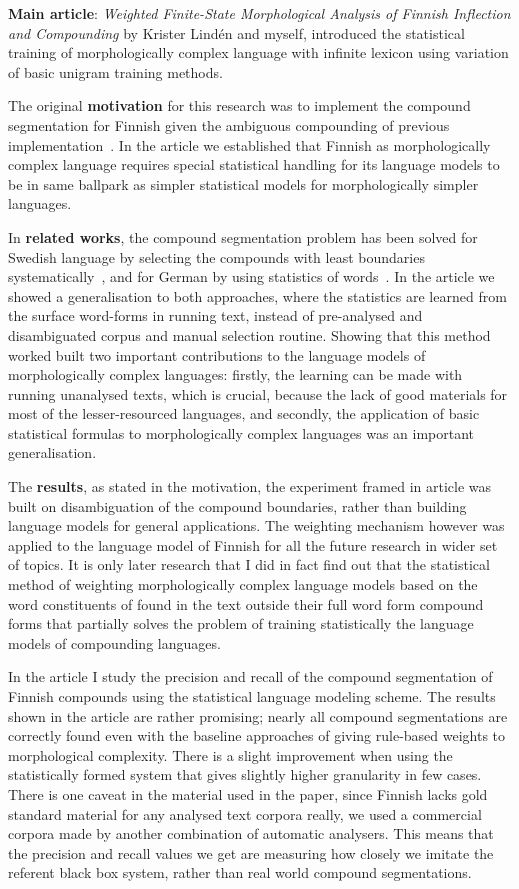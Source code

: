 \documentclass[officiallayout]{unihelcompling}
\begin{document}
\textbf{Main article}: \emph{Weighted Finite-State Morphological Analysis of
Finnish Inflection and Compounding}  by Krister
Lindén and myself, introduced the statistical training of morphologically
complex language with infinite lexicon using variation of basic unigram
training methods.

The original \textbf{motivation} for this research was to implement the
compound segmentation for Finnish given the ambiguous compounding of previous
implementation~\citep{pirinen2008suomen}. In the article we established that
Finnish as morphologically complex language requires special statistical
handling for its language models to be in same ballpark as simpler statistical
models for morphologically simpler languages.

In \textbf{related works}, the compound segmentation problem has been solved
for Swedish language by selecting the compounds with least boundaries
systematically~\citep{karlsson1992swetwol}, and for German by using statistics
of words~\citep{schiller2006german}. In the article we showed a generalisation
to both approaches, where the statistics are learned from the surface
word-forms in running text, instead of pre-analysed and disambiguated corpus
and manual selection routine.  Showing that this method worked built two
important contributions to the language models of morphologically complex
languages: firstly, the learning can be made with running unanalysed texts,
which is crucial, because the lack of good materials for most of the
lesser-resourced languages, and secondly, the application of basic statistical
formulas to morphologically complex languages was an important generalisation.

The \textbf{results}, as stated in the motivation, the experiment framed in
article was built on disambiguation of the compound boundaries, rather than
building language models for general applications. The weighting mechanism
however was applied to the language model of Finnish for all the future
research in wider set of topics. It is only later research that I did in fact
find out that the statistical method of weighting morphologically complex
language models based on the word constituents of found in the text outside
their full word form compound forms that partially solves the problem of
training statistically the language models of compounding languages.

In the article I study the precision and recall of the compound segmentation
of Finnish compounds using the statistical language modeling scheme. The
results shown in the article are rather promising; nearly all compound
segmentations are correctly found even with the baseline approaches of giving
rule-based weights to morphological complexity. There is a slight improvement
when using the statistically formed system that gives slightly higher
granularity in few cases. There is one caveat in the material used in the
paper, since Finnish lacks gold standard material for any analysed text
corpora really, we used a commercial corpora made by another combination
of automatic analysers. This means that the precision and recall values we
get are measuring how closely we imitate the referent black box system, rather
than real world compound segmentations.
\end{document}
